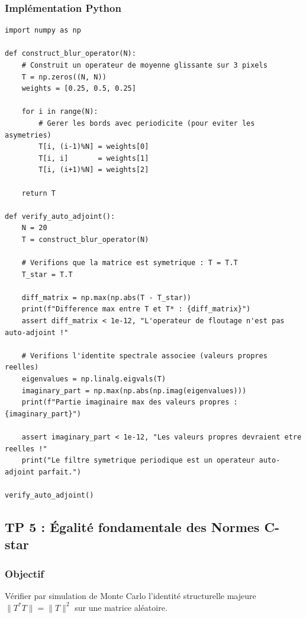 \documentclass[11pt,a4paper]{article}
\begin{document}
\subsubsection*{Implémentation Python}
\begin{lstlisting}
import numpy as np

def construct_blur_operator(N):
    # Construit un operateur de moyenne glissante sur 3 pixels
    T = np.zeros((N, N))
    weights = [0.25, 0.5, 0.25]

    for i in range(N):
        # Gerer les bords avec periodicite (pour eviter les asymetries)
        T[i, (i-1)%N] = weights[0]
        T[i, i]       = weights[1]
        T[i, (i+1)%N] = weights[2]

    return T

def verify_auto_adjoint():
    N = 20
    T = construct_blur_operator(N)

    # Verifions que la matrice est symetrique : T = T.T
    T_star = T.T

    diff_matrix = np.max(np.abs(T - T_star))
    print(f"Difference max entre T et T* : {diff_matrix}")
    assert diff_matrix < 1e-12, "L'operateur de floutage n'est pas auto-adjoint !"

    # Verifions l'identite spectrale associee (valeurs propres reelles)
    eigenvalues = np.linalg.eigvals(T)
    imaginary_part = np.max(np.abs(np.imag(eigenvalues)))
    print(f"Partie imaginaire max des valeurs propres : {imaginary_part}")

    assert imaginary_part < 1e-12, "Les valeurs propres devraient etre reelles !"
    print("Le filtre symetrique periodique est un operateur auto-adjoint parfait.")

verify_auto_adjoint()
\end{lstlisting}


\subsection*{TP 5 : Égalité fondamentale des Normes C-star }
\subsubsection*{Objectif}
Vérifier par simulation de Monte Carlo l'identité structurelle majeure $\|T^* T\| = \|T\|^2$ sur une matrice aléatoire.
\end{document}
